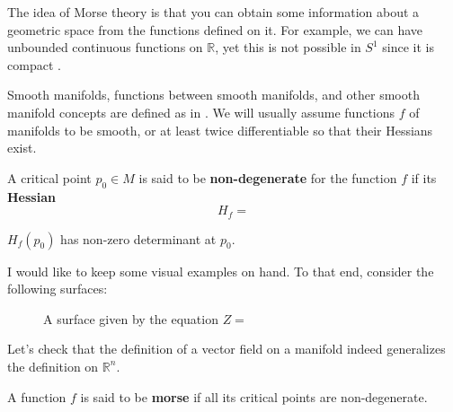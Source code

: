 \documentclass[../main.tex]{subfiles}
\begin{document}
	
	The idea of Morse theory is that you can obtain some information about a geometric space from the functions defined on it. For example, we can have unbounded continuous functions on $\mathbb{R}$, yet this is not possible in $S^1$ since it is compact \cite{matsumoto2002introduction}.
	
	Smooth manifolds, functions between smooth manifolds, and other smooth manifold concepts are defined as in \cite[150]{lee2003introduction}. We will usually assume functions $f$ of manifolds to be smooth, or at least twice differentiable so that their Hessians exist.
	
	\begin{definition}
		A critical point $p_0\in M$ is said to be \textbf{non-degenerate} for the function $f$ if its \textbf{Hessian} 
		\begin{equation}
			H_f=
		\end{equation}
		
		
		$H_f(p_0)$ has non-zero determinant at $p_0$.
	\end{definition}
	
	I would like to keep some visual examples on hand. To that end, consider the following surfaces:
	
	\begin{figure}[H]
		\begin{center}
			
		\end{center}
		\caption{A surface given by the equation $Z=$}
	\end{figure}
	
	\begin{example}
		
	\end{example}
	
	\begin{example}
		
	\end{example}
	
	\begin{definition}
		
	\end{definition}
	
	\begin{example}
		Let's check that the definition of a vector field on a manifold indeed generalizes the definition on $\mathbb{R}^n$.
	\end{example}
	
	\begin{definition}
		A function $f$ is said to be \textbf{morse} if all its critical points are non-degenerate.
	\end{definition}

	
	\ifSubfilesClassLoaded{
			
			
	}{}



	
\end{document}
